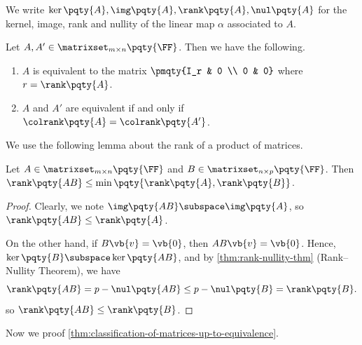\begin{notation}
    We write \(\ker\pqty{A}, \img\pqty{A}, \rank\pqty{A}, \nul\pqty{A}\) for the kernel, image, rank and nullity of the linear map \(\alpha\) associated to \(A\).
\end{notation}

\begin{theorem}
    \label{thm:classification-of-matrices-up-to-equivalence}%
    Let \(A, A' \in \matrixset_{m \times n} \pqty{\FF}\). Then we have the following.
    \begin{enumerate}[label=(\roman*)]
        \item \(A\) is equivalent to the matrix \(\pmqty{I_r & 0 \\ 0 & 0}\) where \(r = \rank\pqty{A}\).
        \item \(A\) and \(A'\) are equivalent if and only if \(\colrank\pqty{A} = \colrank\pqty{A'}\).
    \end{enumerate}
\end{theorem}

We use the following lemma about the rank of a product of matrices.

\begin{lemma}
    \label{lem:rank-of-product-of-matrices}%
    Let \(A \in \matrixset_{m \times n} \pqty{\FF}\) and \(B \in \matrixset_{n \times p} \pqty{\FF}\). Then \(\rank \pqty{AB} \leq \min\pqty{\rank\pqty{A}, \rank\pqty{B}}\).
\end{lemma}

\begin{proof}
    Clearly, we note \(\img \pqty{AB} \subspace \img\pqty{A}\), so \(\rank\pqty{AB} \leq \rank\pqty{A}\).

    On the other hand, if \(B \vb{v} = \vb{0}\), then \(AB \vb{v} = \vb{0}\). Hence, \(\ker\pqty{B} \subspace \ker\pqty{AB}\), and by \autoref{thm:rank-nullity-thm} (Rank--Nullity Theorem), we have
    \[
        \rank\pqty{AB} = p - \nul\pqty{AB} \leq p - \nul\pqty{B} = \rank\pqty{B}.
    \]
    so \(\rank \pqty{AB} \leq \rank \pqty{B}\).
\end{proof}

Now we proof \autoref{thm:classification-of-matrices-up-to-equivalence}.

